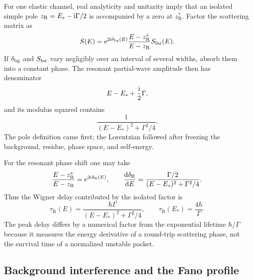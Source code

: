 For one elastic channel, real analyticity and unitarity imply that an isolated
simple pole $z_{\mathrm R}=E_*-\mathrm{i}\Gamma/2$ is accompanied by a zero at
$z_{\mathrm R}^*$.  Factor the scattering matrix as
\begin{equation}
  S(E)
  =\mathrm{e}^{2\mathrm{i}\delta_{\mathrm{bg}}(E)}
  \frac{E-z_{\mathrm R}^*}{E-z_{\mathrm R}}
  S_{\mathrm{far}}(E).
  \label{eq:unitary-pole-factor}
\end{equation}
If $\delta_{\mathrm{bg}}$ and $S_{\mathrm{far}}$ vary negligibly over an
interval of several widths, absorb them into a constant phase.  The resonant
partial-wave amplitude then has denominator
\begin{equation}
  E-E_*+\frac{\mathrm{i}}{2}\Gamma,
  \label{eq:breit-wigner-amplitude-denominator}
\end{equation}
and its modulus squared contains
\begin{equation}
  \frac{1}{(E-E_*)^2+\Gamma^2/4}.
  \label{eq:breit-wigner-lorentzian}
\end{equation}
The pole definition came first; the Lorentzian followed after freezing the
background, residue, phase space, and self-energy.

For the resonant phase shift one may take
\begin{equation}
  \frac{E-z_{\mathrm R}^*}{E-z_{\mathrm R}}
  =\mathrm{e}^{2\mathrm{i}\delta_{\mathrm R}(E)},
  \qquad
  \frac{\mathrm{d}\delta_{\mathrm R}}{\mathrm{d} E}
  =\frac{\Gamma/2}
  {(E-E_*)^2+\Gamma^2/4}.
  \label{eq:resonant-phase-derivative}
\end{equation}
Thus the Wigner delay contributed by the isolated factor is
\begin{equation}
  \tau_{\mathrm R}(E)
  =\frac{\hbar\Gamma}
  {(E-E_*)^2+\Gamma^2/4},
  \qquad
  \tau_{\mathrm R}(E_*)=\frac{4\hbar}{\Gamma}.
  \label{eq:breit-wigner-time-delay}
\end{equation}
The peak delay differs by a numerical factor from the exponential lifetime
$\hbar/\Gamma$ because it measures the energy derivative of a round-trip
scattering phase, not the survival time of a normalized unstable packet.

\subsection{Background interference and the Fano profile}
\label{subsec:fano-from-pole}


